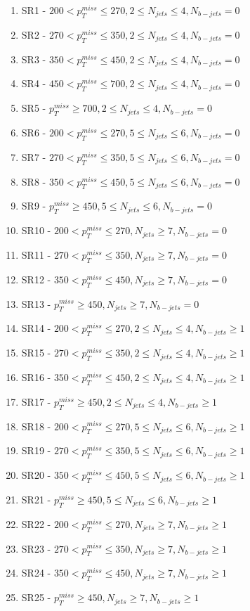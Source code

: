 \documentclass[a4paper, 10pt]{article}
\begin{document}
\begin{enumerate}
\item SR1 - $200 <p_T^{miss}\leq270 , 2 \leq N_{jets}\leq 4 , N_{b-jets} = 0 $ 
\item SR2 - $270 <p_T^{miss}\leq350 , 2 \leq N_{jets}\leq 4 , N_{b-jets} = 0 $
\item SR3 - $350 <p_T^{miss}\leq450 , 2 \leq N_{jets}\leq 4 , N_{b-jets} = 0 $
\item SR4 - $450 <p_T^{miss}\leq700 , 2 \leq N_{jets}\leq 4 , N_{b-jets} = 0 $
\item SR5 - $p_T^{miss}\geq700      , 2 \leq N_{jets}\leq 4 , N_{b-jets} = 0 $
\item SR6 - $200 <p_T^{miss}\leq270 , 5 \leq N_{jets}\leq 6 , N_{b-jets} = 0 $
\item SR7 - $270 <p_T^{miss}\leq350 , 5 \leq N_{jets}\leq 6 , N_{b-jets} = 0 $
\item SR8 - $350 <p_T^{miss}\leq450 , 5 \leq N_{jets}\leq 6 , N_{b-jets} = 0 $
\item SR9 - $p_T^{miss}\geq450 , 5 \leq N_{jets}\leq 6 , N_{b-jets} = 0 $
\item SR10 - $200 <p_T^{miss}\leq270 , N_{jets}\geq 7 , N_{b-jets} = 0 $
\item SR11 - $270 <p_T^{miss}\leq350 , N_{jets}\geq 7 , N_{b-jets} = 0 $
\item SR12 - $350 <p_T^{miss}\leq450 , N_{jets}\geq 7 , N_{b-jets} = 0 $
\item SR13 - $p_T^{miss}\geq450 , N_{jets}\geq 7 , N_{b-jets} = 0 $
\item SR14 - $200 <p_T^{miss}\leq270 , 2 \leq N_{jets}\leq 4 , N_{b-jets} \geq 1 $
\item SR15 - $270 <p_T^{miss}\leq350 , 2 \leq N_{jets}\leq 4 , N_{b-jets} \geq 1 $
\item SR16 - $350 <p_T^{miss}\leq450 , 2 \leq N_{jets}\leq 4 , N_{b-jets} \geq 1 $
\item SR17 - $p_T^{miss}\geq450 , 2 \leq N_{jets}\leq 4 , N_{b-jets} \geq 1 $
\item SR18 - $200 <p_T^{miss}\leq270 , 5 \leq N_{jets}\leq 6 , N_{b-jets} \geq 1 $
\item SR19 - $270 <p_T^{miss}\leq350 , 5 \leq N_{jets}\leq 6 , N_{b-jets} \geq 1 $
\item SR20 - $350 <p_T^{miss}\leq450 , 5 \leq N_{jets}\leq 6 , N_{b-jets} \geq 1 $
\item SR21 - $p_T^{miss}\geq450 , 5 \leq N_{jets}\leq 6 , N_{b-jets} \geq 1 $
\item SR22 - $200 <p_T^{miss}\leq270 , N_{jets}\geq 7 , N_{b-jets} \geq 1 $
\item SR23 - $270 <p_T^{miss}\leq350 , N_{jets}\geq 7 , N_{b-jets} \geq 1 $
\item SR24 - $350 <p_T^{miss}\leq450 , N_{jets}\geq 7 , N_{b-jets} \geq 1 $
\item SR25 - $p_T^{miss}\geq450 , N_{jets}\geq 7 , N_{b-jets} \geq 1 $
\end{enumerate}
\end{document}
